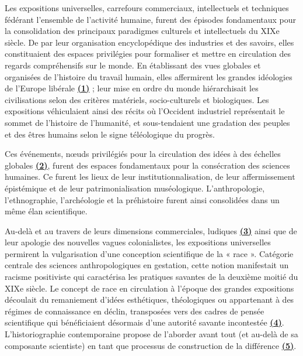 \documentclass{article}
\begin{document}
	Les expositions universelles, carrefours commerciaux, intellectuels et techniques fédérant l’ensemble de l’activité humaine, furent des épisodes fondamentaux pour la consolidation des principaux paradigmes culturels et intellectuels du XIXe siècle. De par leur organisation encyclopédique des industries et des savoirs, elles constituaient des espaces privilégies pour formaliser et mettre en circulation des regards compréhensifs sur le monde. En établissant des vues globales et organisées de l’histoire du travail humain, elles affermirent les grandes idéologies de l’Europe libérale \underline{\textbf{(1)}} ; leur mise en ordre du monde hiérarchisait les civilisations selon des critères matériels, socio-culturels et biologiques. Les expositions véhiculaient ainsi des récits où l’Occident industriel représentait le sommet de l’histoire de l’humanité, et sous-tendaient une gradation des peuples et des êtres humains selon le signe téléologique du progrès.
	
	Ces événements, nœuds privilégiés pour la circulation des idées à des échelles globales \textbf{\underline{(2)}}, furent des espaces fondamentaux pour la consécration des sciences humaines. Ce furent les lieux de leur institutionnalisation, de leur affermissement épistémique et de leur patrimonialisation muséologique. L’anthropologie, l’ethnographie, l’archéologie et la préhistoire furent ainsi consolidées dans un même élan scientifique.
	
	Au-delà et au travers de leurs dimensions commerciales, ludiques \textbf{\underline{(3)}} ainsi que de leur apologie des nouvelles vagues colonialistes, les expositions universelles permirent la vulgarisation d’une conception scientifique de la « race ». Catégorie centrale des sciences anthropologiques en gestation, cette notion manifestait un racisme positiviste qui caractérisa les pratiques savantes de la deuxième moitié du XIXe siècle. Le concept de race en circulation à l’époque des grandes expositions découlait du remaniement d’idées esthétiques, théologiques ou appartenant à des régimes de connaissance en déclin, transposées vers des cadres de pensée scientifique qui bénéficiaient désormais d’une autorité savante incontestée \textbf{\underline{(4)}}. L’historiographie contemporaine propose de l’aborder avant tout (et au-delà de sa composante scientiste) en tant que processus de construction de la différence \textbf{\underline{(5)}}.
	
\end{document}

